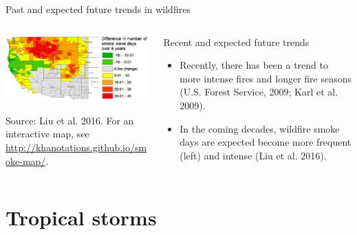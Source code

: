 \documentclass[ignorenonframetext,]{beamer}
\begin{document}
\begin{frame}{Past and expected future trends in wildfires}

\begin{columns}

\begin{column}{0.6\textwidth}

\begin{center}\includegraphics[width=\textwidth]{future_wildfire} \end{center}
\scriptsize Source: Liu et al. 2016. For an interactive map, see \url{http://khanotations.github.io/smoke-map/}.
\end{column}

\begin{column}{0.4\textwidth}
\begin{block}{Recent and expected future trends}
\small
\begin{itemize}
  \item Recently, there has been a trend to more intense fires and longer fire seasons (U.S. Forest Service, 2009; Karl et al. 2009).
  \item In the coming decades, wildfire smoke days are expected become more frequent (left) and intense (Liu et al. 2016).
\end{itemize}
\end{block}
\end{column}

\end{columns}

\end{frame}

\section{Tropical storms}\label{tropical-storms}
\end{document}
